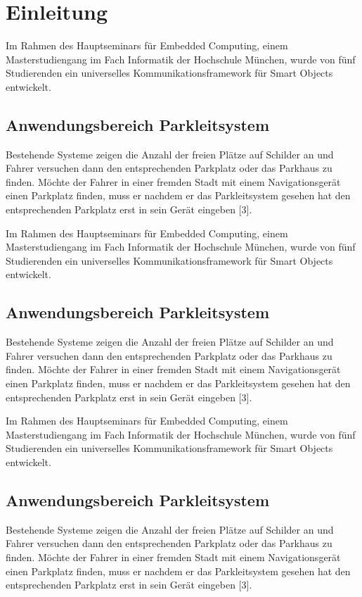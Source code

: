 \section{Einleitung}

Im Rahmen des Hauptseminars für Embedded Computing, einem Masterstudiengang im Fach Informatik der Hochschule München, wurde von fünf Studierenden ein universelles Kommunikationsframework für Smart Objects entwickelt.


\subsection{Anwendungsbereich Parkleitsystem}

Bestehende Systeme zeigen die Anzahl der freien Plätze auf Schilder an und Fahrer versuchen dann den entsprechenden Parkplatz oder das Parkhaus zu finden. Möchte der Fahrer in einer fremden Stadt mit einem Navigationsgerät einen Parkplatz finden, muss er nachdem er das Parkleitsystem gesehen hat den entsprechenden Parkplatz erst in sein Gerät eingeben [3].

Im Rahmen des Hauptseminars für Embedded Computing, einem Masterstudiengang im Fach Informatik der Hochschule München, wurde von fünf Studierenden ein universelles Kommunikationsframework für Smart Objects entwickelt.


\subsection{Anwendungsbereich Parkleitsystem}

Bestehende Systeme zeigen die Anzahl der freien Plätze auf Schilder an und Fahrer versuchen dann den entsprechenden Parkplatz oder das Parkhaus zu finden. Möchte der Fahrer in einer fremden Stadt mit einem Navigationsgerät einen Parkplatz finden, muss er nachdem er das Parkleitsystem gesehen hat den entsprechenden Parkplatz erst in sein Gerät eingeben [3].

Im Rahmen des Hauptseminars für Embedded Computing, einem Masterstudiengang im Fach Informatik der Hochschule München, wurde von fünf Studierenden ein universelles Kommunikationsframework für Smart Objects entwickelt.


\subsection{Anwendungsbereich Parkleitsystem}

Bestehende Systeme zeigen die Anzahl der freien Plätze auf Schilder an und Fahrer versuchen dann den entsprechenden Parkplatz oder das Parkhaus zu finden. Möchte der Fahrer in einer fremden Stadt mit einem Navigationsgerät einen Parkplatz finden, muss er nachdem er das Parkleitsystem gesehen hat den entsprechenden Parkplatz erst in sein Gerät eingeben [3].
